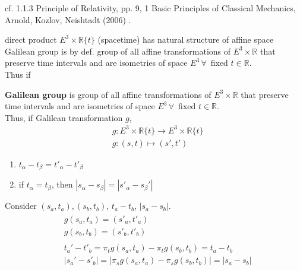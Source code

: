 cf. 1.1.3 Principle of Relativity, pp. 9, 1 Basic Principles of Classical Mechanics, Arnold, Kozlov, Neishtadt (2006) \cite{dgdt:AKN2006}.

direct product $E^3 \times \mathbb{R}\lbrace t \rbrace$ (spacetime) has natural structure of affine space \\
Galilean group is by def. group of all affine transformations of $E^3 \times \mathbb{R}$ that preserve time intervals and are isometries of space $E^3 \, \forall \,$ fixed $t\in \mathbb{R}$.  \\

Thus if 
\begin{definition}\label{dgdt:Def:GalileanGroup}
\textbf{Galilean group} is group of all affine transformations of $E^3 \times \mathbb{R}$ that preserve time intervals and are isometries of space $E^3 \, \forall \, $ fixed $t\in \mathbb{R}$. \\

Thus, if Galilean transformation $g$, 
\begin{equation}
\begin{aligned}
& g: E^3 \times \mathbb{R}\lbrace t\rbrace \to E^3 \times \mathbb{R} \lbrace t \rbrace \\
& g:(s,t) \mapsto (s', t')
\end{aligned}
\end{equation}
\begin{enumerate}
	\item $t_{\alpha} - t_{\beta} = t'_{\alpha} - t'_{\beta}$ \\
	\item if $t_{\alpha} = t_{\beta}$, then $|s_{\alpha} - s_{\beta} | = |s'_{\alpha} - s_{\beta}' |$
\end{enumerate}

\end{definition}

Consider $(s_a,t_a), (s_b, t_b)$, $t_a - t_b$, $|s_a - s_b|$.
\[
\begin{gathered}
\begin{aligned}
	& g(s_a, t_a) = (s'_a, t'_a) \\ 
	& g(s_b,t_b) = (s'_b, t'_b)
\end{aligned} \\
\begin{aligned}
& t_a' - t'_b = \pi_tg(s_a, t_a) - \pi_tg(s_b, t_b) = t_a - t_b \\ 
& |s_a' - s'_b| = | \pi_s g(s_a,t_a) - \pi_sg(s_b,t_b) | = |s_a-s_b|
\end{aligned}
\end{gathered}
\]

